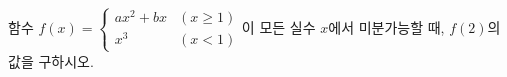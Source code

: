 함수 $f(x)=\begin{cases} ax^2+bx & (x\ge 1) \\ x^3 & (x<1) \end{cases}$이 모든 실수 $x$에서 미분가능할 때, $f(2)$의 값을 구하시오. 
